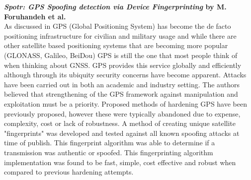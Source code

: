 \medskip

\textbf{\emph{Spotr: GPS Spoofing detection via Device Fingerprinting} by M. Foruhandeh et al.}\\
As discussed in \cite{RN7} GPS (Global Positioning System) has become the de facto positioning infrastructure for civilian and 
military usage and while there are other satellite based positioning systems that are becoming more popular (GLONASS, Galileo, BeiDou) GPS is 
still the one that most people think of when thinking about GNSS. GPS provides this service globally and efficiently although through its ubiquity
security concerns have become apparent. Attacks have been carried out in both an academic and industry setting.
The authors believed that strengthening of the GPS framework against manipulation and exploitation must be a priority.
Proposed methods of hardening GPS have been previously proposed, however these were typically abandoned due to expense, complexity, cost or lack of robustness. 
A method of creating unique satellite "fingerprints" was developed and tested against all known spoofing attacks at time of publish.
This fingerprint algorithm was able to determine if a transmission was authentic or spoofed.
This fingerprinting algorithm implementation was found to be fast, simple, cost effective and robust when compared to previous hardening attempts.  

\medskip

